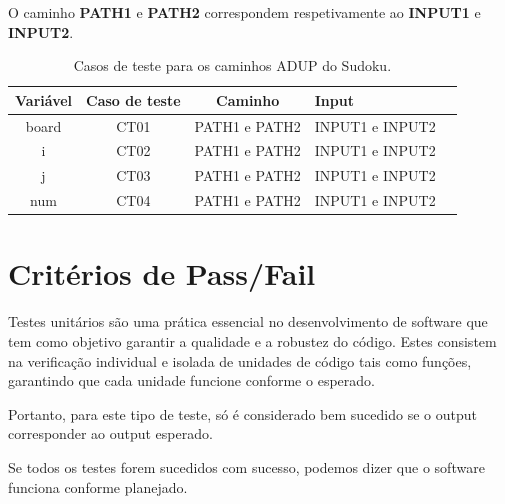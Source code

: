 \documentclass{article}
\begin{document}
\begin{itemize}
\begin{enumerate}
\begin{itemize}
    \end{itemize}
    O caminho \textbf{PATH1} e \textbf{PATH2} correspondem respetivamente ao \textbf{INPUT1} e \textbf{INPUT2}.
    
    \begin{table}[H]
        \centering
        \begin{tabular}{|c|c|c|p{4cm}|c|} %
        \hline
        \textbf{Variável} & \textbf{Caso de teste} & \textbf{Caminho} & \textbf{Input} \\ \hline
        board & CT01 & PATH1 e PATH2 & INPUT1 e INPUT2    \\ \hline
        i & CT02 & PATH1 e PATH2 & INPUT1 e INPUT2   \\ \hline
        j & CT03 & PATH1 e PATH2 & INPUT1 e INPUT2   \\ \hline
        num & CT04 &  PATH1 e PATH2 & INPUT1 e INPUT2   \\ 
        \hline
    \end{tabular}
    \caption{Casos de teste para os caminhos ADUP do Sudoku.}
    \label{tab:tabela_exemplo}
\end{table}
    
    \end{enumerate}

    
\end{itemize}



\section{Critérios de Pass/Fail}

\texttt{}\par Testes unitários são uma prática essencial no desenvolvimento de software que tem como objetivo garantir a qualidade e a robustez do código. Estes consistem na verificação individual e isolada de unidades de código tais como funções, garantindo que cada unidade funcione conforme o esperado.

Portanto, para este tipo de teste, só é considerado bem sucedido se o output corresponder ao output esperado.

Se todos os testes forem sucedidos com sucesso, podemos dizer que o software funciona conforme planejado.
\end{document}
